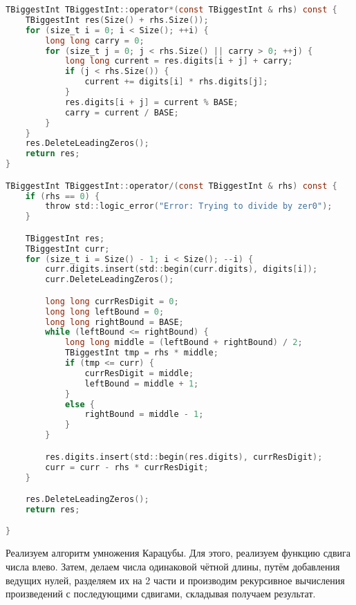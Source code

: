 \begin{lstlisting}[language=C]
TBiggestInt TBiggestInt::operator*(const TBiggestInt & rhs) const {
    TBiggestInt res(Size() + rhs.Size());
    for (size_t i = 0; i < Size(); ++i) {
        long long carry = 0;
        for (size_t j = 0; j < rhs.Size() || carry > 0; ++j) {
            long long current = res.digits[i + j] + carry;
            if (j < rhs.Size()) {
                current += digits[i] * rhs.digits[j];
            }
            res.digits[i + j] = current % BASE;
            carry = current / BASE;
        }
    }
    res.DeleteLeadingZeros();
    return res;
}

TBiggestInt TBiggestInt::operator/(const TBiggestInt & rhs) const {
    if (rhs == 0) {
        throw std::logic_error("Error: Trying to divide by zer0");
    }

    TBiggestInt res;
    TBiggestInt curr;
    for (size_t i = Size() - 1; i < Size(); --i) {
        curr.digits.insert(std::begin(curr.digits), digits[i]);
        curr.DeleteLeadingZeros();

        long long currResDigit = 0;
        long long leftBound = 0;
        long long rightBound = BASE;
        while (leftBound <= rightBound) {
            long long middle = (leftBound + rightBound) / 2;
            TBiggestInt tmp = rhs * middle;
            if (tmp <= curr) {
                currResDigit = middle;
                leftBound = middle + 1;
            }
            else {
                rightBound = middle - 1;
            }   
        }

        res.digits.insert(std::begin(res.digits), currResDigit);
        curr = curr - rhs * currResDigit;
    }

    res.DeleteLeadingZeros();
    return res;

}
\end{lstlisting}

Реализуем алгоритм умножения Карацубы. Для этого, реализуем функцию сдвига числа влево. Затем, делаем числа одинаковой чётной длины, путём добавления ведущих нулей, разделяем их на 2 части и производим рекурсивное вычисления произведений с последующими сдвигами, складывая получаем результат. 

